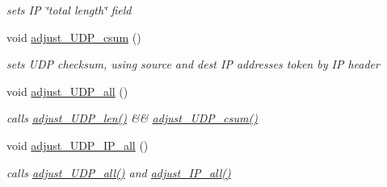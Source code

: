\begin{CompactItemize}
\begin{CompactList}\small\item\em sets IP \char`\"{}total length\char`\"{} field \item\end{CompactList}\item 
\hypertarget{classsocketpp_1_1UDP__IP__RawSocket_6c2f6c375cec90f64fd093af37369d6a}{
void \hyperlink{classsocketpp_1_1UDP__IP__RawSocket_6c2f6c375cec90f64fd093af37369d6a}{adjust\_\-UDP\_\-csum} ()}
\label{classsocketpp_1_1UDP__IP__RawSocket_6c2f6c375cec90f64fd093af37369d6a}

\begin{CompactList}\small\item\em sets UDP checksum, using source and dest IP addresses token by IP header \item\end{CompactList}\item 
\hypertarget{classsocketpp_1_1UDP__IP__RawSocket_94bec31d8c856ccdafa083c74b8b7e58}{
void \hyperlink{classsocketpp_1_1UDP__IP__RawSocket_94bec31d8c856ccdafa083c74b8b7e58}{adjust\_\-UDP\_\-all} ()}
\label{classsocketpp_1_1UDP__IP__RawSocket_94bec31d8c856ccdafa083c74b8b7e58}

\begin{CompactList}\small\item\em calls \hyperlink{classsocketpp_1_1UDP__RawSocket_1caa413cfe4f72d8c0aeccdcb10469b5}{adjust\_\-UDP\_\-len()} \&\& \hyperlink{classsocketpp_1_1UDP__IP__RawSocket_6c2f6c375cec90f64fd093af37369d6a}{adjust\_\-UDP\_\-csum()} \item\end{CompactList}\item 
\hypertarget{classsocketpp_1_1UDP__IP__RawSocket_1a0f6360760f94f5c1569adde67d6d1b}{
void \hyperlink{classsocketpp_1_1UDP__IP__RawSocket_1a0f6360760f94f5c1569adde67d6d1b}{adjust\_\-UDP\_\-IP\_\-all} ()}
\label{classsocketpp_1_1UDP__IP__RawSocket_1a0f6360760f94f5c1569adde67d6d1b}

\begin{CompactList}\small\item\em calls \hyperlink{classsocketpp_1_1UDP__IP__RawSocket_94bec31d8c856ccdafa083c74b8b7e58}{adjust\_\-UDP\_\-all()} and \hyperlink{classsocketpp_1_1IP__RawSocket_45e60510233daaa2f279d3a4706fdce5}{adjust\_\-IP\_\-all()} \item\end{CompactList}\end{CompactItemize}
